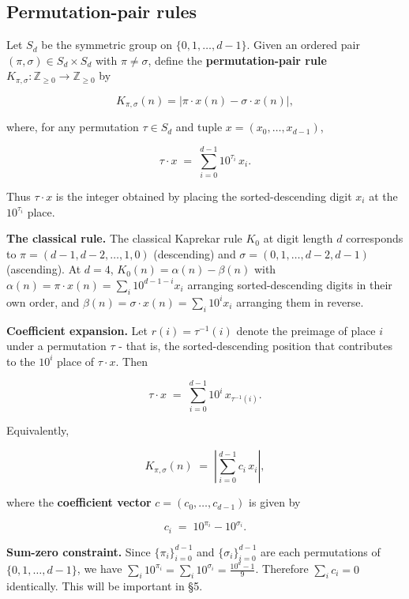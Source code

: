 \documentclass[11pt,letterpaper]{article}
\theoremstyle{paperstyle}
\theoremstyle{paperstyledef}
\theoremstyle{paperstylerem}
\begin{document}
\hypertarget{permutation-pair-rules-1}{%
\subsection{Permutation-pair rules}\label{permutation-pair-rules-1}}

Let \(S_d\) be the symmetric group on \(\{0, 1, \ldots, d-1\}\). Given
an ordered pair \((\pi, \sigma) \in S_d \times S_d\) with
\(\pi \neq \sigma\), define the \textbf{permutation-pair rule}
\(K_{\pi, \sigma}: \mathbb{Z}_{\geq 0} \to \mathbb{Z}_{\geq 0}\) by

\[K_{\pi, \sigma}(n) = \left| \pi \cdot x(n) - \sigma \cdot x(n) \right|,\]

where, for any permutation \(\tau \in S_d\) and tuple
\(x = (x_0, \ldots, x_{d-1})\),

\[\tau \cdot x \;=\; \sum_{i = 0}^{d-1} 10^{\tau_i} \, x_i.\]

Thus \(\tau \cdot x\) is the integer obtained by placing the
sorted-descending digit \(x_i\) at the \(10^{\tau_i}\) place.

\textbf{The classical rule.} The classical Kaprekar rule \(K_0\) at
digit length \(d\) corresponds to \(\pi = (d-1, d-2, \ldots, 1, 0)\)
(descending) and \(\sigma = (0, 1, \ldots, d-2, d-1)\) (ascending). At
\(d = 4\), \(K_0(n) = \alpha(n) - \beta(n)\) with
\(\alpha(n) = \pi \cdot x(n) = \sum_i 10^{d-1-i} x_i\) arranging
sorted-descending digits in their own order, and
\(\beta(n) = \sigma \cdot x(n) = \sum_i 10^i x_i\) arranging them in
reverse.

\textbf{Coefficient expansion.} Let \(r(i) = \tau^{-1}(i)\) denote the
preimage of place \(i\) under a permutation \(\tau\) - that is, the
sorted-descending position that contributes to the \(10^i\) place of
\(\tau \cdot x\). Then

\[\tau \cdot x \;=\; \sum_{i = 0}^{d-1} 10^i \, x_{\tau^{-1}(i)}.\]

Equivalently,

\[K_{\pi, \sigma}(n) \;=\; \left| \sum_{i = 0}^{d-1} c_i \, x_i \right|,\]

where the \textbf{coefficient vector} \(c = (c_0, \ldots, c_{d-1})\) is
given by

\[c_i \;=\; 10^{\pi_i} - 10^{\sigma_i}.\]

\textbf{Sum-zero constraint.} Since \(\{\pi_i\}_{i=0}^{d-1}\) and
\(\{\sigma_i\}_{i=0}^{d-1}\) are each permutations of
\(\{0, 1, \ldots, d-1\}\), we have
\(\sum_i 10^{\pi_i} = \sum_i 10^{\sigma_i} = \frac{10^d - 1}{9}\).
Therefore \(\sum_i c_i = 0\) identically. This will be important in §5.
\end{document}
